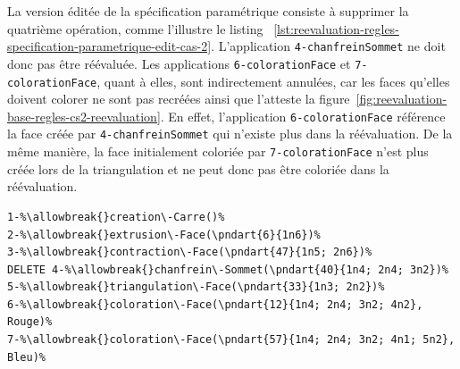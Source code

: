 La version éditée de la spécification paramétrique consiste à supprimer la
quatrième opération, comme l'illustre le listing
~\ref{lst:reevaluation-regles-specification-parametrique-edit-cas-2}. %
L'application \texttt{4-\allowbreak{}chanfreinSommet} ne doit donc pas être réévaluée. %
Les applications \texttt{6-\allowbreak{}coloration\-Face} et
\texttt{7-\allowbreak{}coloration\-Face}, quant à elles, sont indirectement annulées, car les faces qu'elles doivent colorer ne sont pas recréées ainsi que l'atteste la
figure~\ref{fig:reevaluation-base-regles-cs2-reevaluation}.
En effet, l'application \texttt{6-coloration\-Face} référence la face créée par
\texttt{4-\allowbreak{}chanfrein\-Sommet} qui n'existe plus dans la réévaluation. %
De la même manière, la face initialement coloriée par \texttt{7-\allowbreak{}coloration\-Face}
n'est plus créée lors de la triangulation et ne peut donc pas être coloriée dans
la réévaluation. %

\begin{lstlisting}[escapechar=\%,
style=script-style,
caption=Spécification paramétrique éditée du cas nº~2,
label=lst:reevaluation-regles-specification-parametrique-edit-cas-2,
captionpos=b]
1-%\allowbreak{}creation\-Carre()%
2-%\allowbreak{}extrusion\-Face(\pndart{6}{1n6})%
3-%\allowbreak{}contraction\-Face(\pndart{47}{1n5; 2n6})%
DELETE 4-%\allowbreak{}chanfrein\-Sommet(\pndart{40}{1n4; 2n4; 3n2})%
5-%\allowbreak{}triangulation\-Face(\pndart{33}{1n3; 2n2})%
6-%\allowbreak{}coloration\-Face(\pndart{12}{1n4; 2n4; 3n2; 4n2}, Rouge)%
7-%\allowbreak{}coloration\-Face(\pndart{57}{1n4; 2n4; 3n2; 4n1; 5n2}, Bleu)%
\end{lstlisting}



